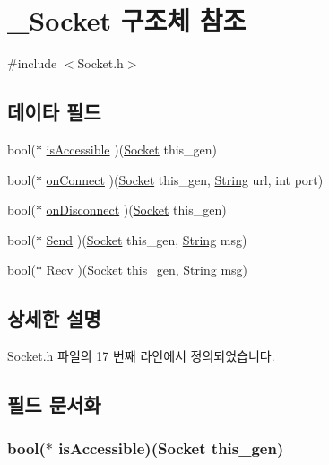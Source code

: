 \hypertarget{struct___socket}{\section{\-\_\-\-Socket 구조체 참조}
\label{struct___socket}
}


{\ttfamily \#include $<$Socket.\-h$>$}

\subsection*{데이타 필드}
\begin{DoxyCompactItemize}
\item 
bool($\ast$ \hyperlink{struct___socket_ac1ad80a37ffe5c487d7951ba7bb3f825}{is\-Accessible} )(\hyperlink{_socket_8h_acf44cb15f4425e3df069d9e6639bd989}{Socket} this\-\_\-gen)
\item 
bool($\ast$ \hyperlink{struct___socket_a12fc7a8a0e3742d18dec08defeb67435}{on\-Connect} )(\hyperlink{_socket_8h_acf44cb15f4425e3df069d9e6639bd989}{Socket} this\-\_\-gen, \hyperlink{dit_8h_a2efe6d463d80744789f228f5dc4baa39}{String} url, int port)
\item 
bool($\ast$ \hyperlink{struct___socket_ad7a809e33935ee525606738714730f7a}{on\-Disconnect} )(\hyperlink{_socket_8h_acf44cb15f4425e3df069d9e6639bd989}{Socket} this\-\_\-gen)
\item 
bool($\ast$ \hyperlink{struct___socket_a0d82d1d1d78c09f2fa3a3e5709527ae5}{Send} )(\hyperlink{_socket_8h_acf44cb15f4425e3df069d9e6639bd989}{Socket} this\-\_\-gen, \hyperlink{dit_8h_a2efe6d463d80744789f228f5dc4baa39}{String} msg)
\item 
bool($\ast$ \hyperlink{struct___socket_a0a7bae2527254e83c0e79cc118dc8744}{Recv} )(\hyperlink{_socket_8h_acf44cb15f4425e3df069d9e6639bd989}{Socket} this\-\_\-gen, \hyperlink{dit_8h_a2efe6d463d80744789f228f5dc4baa39}{String} msg)
\end{DoxyCompactItemize}


\subsection{상세한 설명}


Socket.\-h 파일의 17 번째 라인에서 정의되었습니다.



\subsection{필드 문서화}
\hypertarget{struct___socket_ac1ad80a37ffe5c487d7951ba7bb3f825}{
\subsubsection[{is\-Accessible}]{\setlength{\rightskip}{0pt plus 5cm}bool($\ast$  is\-Accessible)({\bf Socket} this\-\_\-gen)}}\label{struct___socket_ac1ad80a37ffe5c487d7951ba7bb3f825}


